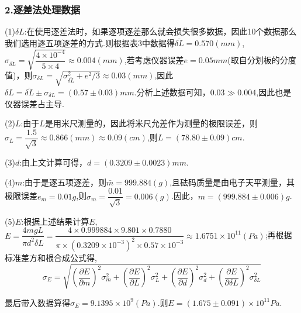\documentclass[12pt,a4paper,UTF8]{ctexart}
\begin{document}
\begin{table}[htbp]
\centering
\caption{测量金属丝受外力拉伸后的伸展变化数据表}
\end{table}
\subsubsection*{2.逐差法处理数据}
(1)$\delta L$:在使用逐差法时，如果逐项逐差那么就会损失很多数据，因此10个数据那么我们选用逐五项逐差的方式.则根据表3中数据得$\overline {\delta L}=0.570(mm)$,$\sigma_{\overline{\delta L}}=\sqrt{\dfrac{4\times 10^{-4}}{5\times 4}}\approx 0.004(mm)$,若考虑仪器误差$e=0.05mm$(取自分划板的分度值)，则$\sigma_{\delta L}=\sqrt{\sigma_{\overline{\delta L}}^2+e^2/3}\approx 0.03(mm)$,因此$\delta L =\overline {\delta L}\pm \sigma_{\delta L}=(0.57\pm0.03)mm$.分析上述数据可知，$0.03 \gg 0.004$,因此也是仪器误差占主导.\par
(2)$L$:由于$L$是用米尺测量的，因此将米尺允差作为测量的极限误差，则$\sigma_L=\dfrac{1.5}{\sqrt{3}}\approx 0.866(mm)\approx 0.09(cm)$,则$L=(78.80\pm0.09)cm$.\par
(3)$d$:由上文计算可得，$d=(0.3209\pm0.0023)mm$.\par
(4)$m$:由于是逐五项逐差，则$\bar m=999.884(g)$,且砝码质量是由电子天平测量，其极限误差$e_m=0.01g$,则$\sigma_m=\dfrac{0.01}{\sqrt{3}}=0.006(g)$.因此，$m=(999.884\pm0.006)g$.\par
(5)$E$:根据上述结果计算$E$,$E=\dfrac{4mgL}{\pi d^2 \delta L}=\dfrac{4\times0.999884\times9.801\times0.7880}{\pi\times(0.3209\times10^{-3})^2\times0.57\times10^{-3}}\approx1.6751\times10^{11}(Pa)$;再根据标准差方和根合成公式得,
$$
\sigma_E=\sqrt{(\frac{\partial E}{\partial m})^2\sigma_m^2+(\frac{\partial E}{\partial L})^2\sigma_L^2+(\frac{\partial E}{\partial d})^2\sigma_d^2+(\frac{\partial E}{\partial \delta L})^2\sigma_{\delta L}^2}
$$
\par
最后带入数据算得$\sigma_E=9.1395\times10^{9}(Pa)$.则$E=(1.675\pm0.091)\times 10^{11}Pa$.
\end{document}
